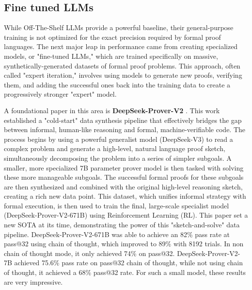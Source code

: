 \documentclass[12pt, letterpaper]{article}
\begin{document}
\subsection{Fine tuned LLMs}
\label{sec:provers}

While Off-The-Shelf LLMs provide a powerful baseline, their general-purpose training is not optimized for the exact precision required by formal proof languages. The next major leap in performance came from creating specialized models, or "fine-tuned LLMs," which are trained specifically on massive, synthetically-generated datasets of formal proof problems. This approach, often called "expert iteration," involves using models to generate new proofs, verifying them, and adding the successful ones back into the training data to create a progressively stronger "expert" model.

A foundational paper in this area is \textbf{DeepSeek-Prover-V2} \citep{ren2025deepseekproverv2advancingformalmathematical}. This work established a "cold-start" data synthesis pipeline that effectively bridges the gap between informal, human-like reasoning and formal, machine-verifiable code. The process begins by using a powerful generalist model (DeepSeek-V3) to read a complex problem and generate a high-level, natural language proof sketch, simultaneously decomposing the problem into a series of simpler subgoals. A smaller, more specialized 7B parameter prover model is then tasked with solving these more manageable subgoals. The successful formal proofs for these subgoals are then synthesized and combined with the original high-level reasoning sketch, creating a rich new data point. This dataset, which unifies informal strategy with formal execution, is then used to train the final, large-scale specialist model (DeepSeek-Prover-V2-671B) using Reinforcement Learning (RL). This paper set a new SOTA at its time, demonstrating the power of this "sketch-and-solve" data pipeline. DeepSeek-Prover-V2-671B was able to achieve an 82\% pass rate at pass@32 using chain of thought, which improved to 89\% with 8192 trials. In non chain of thought mode, it only achieved 74\% on pass@32. DeepSeek-Prover-V2-7B achieved 75.6\% pass rate on  pass@32 chain of thought, while not using chain of thought, it achieved a 68\% pass@32 rate. For such a small model, these results are very impressive.
\end{document}

